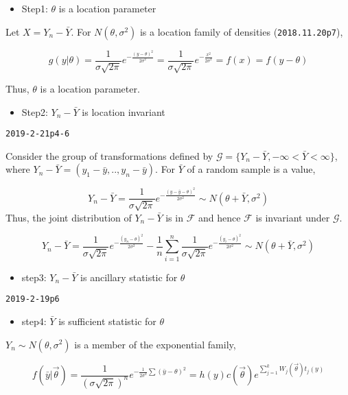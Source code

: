 \documentclass[12pt,]{article}
\providecommand{\tightlist}{%
  \setlength{\itemsep}{0pt}\setlength{\parskip}{0pt}}
\begin{document}
\begin{itemize}
\tightlist
\item
  Step1: \(\theta\) is a location parameter
\end{itemize}

Let \(X=Y_n-\bar Y\). For \(N(\theta,\sigma^2)\) is a location family of
densities (\texttt{2018.11.20p7}),

\[g(y|\theta)=\frac1{\sigma\sqrt{2\pi}}e^{-\frac{(y-\theta)^2}{2\sigma^2}}=\frac1{\sigma\sqrt{2\pi}}e^{-\frac{x^2}{2\sigma^2}}=f(x)=f(y-\theta)\]

Thus, \(\theta\) is a location parameter.

\begin{itemize}
\tightlist
\item
  Step2: \(Y_n-\bar Y\) is location invariant
\end{itemize}

\texttt{2019-2-21p4-6}

Consider the group of transformations defined by
\(\mathcal{G}=\{Y_n-\bar Y,-\infty<\bar Y<\infty\}\), where
\(Y_n-\bar Y=(y_1-\bar y,..,y_n-\bar y)\). For \(\bar Y\) of a random
sample is a value,

\[Y_n-\bar Y=\frac1{\sigma\sqrt{2\pi}}e^{-\frac{(y-\bar y-\theta)^2}{2\sigma^2}}\sim N(\theta+\bar Y,\sigma^2)\]
Thus, the joint distribution of \(Y_n-\bar Y\) is in \(\mathcal{F}\) and
hence \(\mathcal{F}\) is invariant under \(\mathcal{G}\).

\[Y_n-\bar Y=\frac1{\sigma\sqrt{2\pi}}e^{-\frac{(y_n-\theta)^2}{2\sigma^2}}-\frac1n\sum_{i=1}^n\frac1{\sigma\sqrt{2\pi}}e^{-\frac{(y_i-\theta)^2}{2\sigma^2}}\sim N(\theta+\bar Y,\sigma^2)\]

\begin{itemize}
\tightlist
\item
  step3: \(Y_n-\bar Y\) is ancillary statistic for \(\theta\)
\end{itemize}

\texttt{2019-2-19p6}

\begin{itemize}
\tightlist
\item
  step4: \(\bar Y\) is sufficient statistic for \(\theta\)
\end{itemize}

\(Y_n\sim N(\theta,\sigma^2)\) is a member of the exponential family,

\[f(\bar y|\vec\theta)=\frac1{(\sigma\sqrt{2\pi})^n}e^{-\frac{1}{2\sigma^2}\sum(\bar y-\theta)^2}=h(y)c(\vec \theta)e^{\sum^k_{j=1}W_j(\vec \theta)t_j(y)}\]
\end{document}
